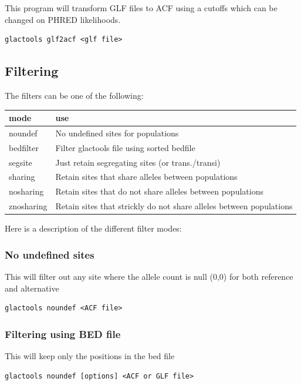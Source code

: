 \documentclass[a4paper]{article}
\begin{document}
This program will transform GLF files to ACF using a cutoffs which can be changed on PHRED likelihoods.
\begin{lstlisting}
glactools glf2acf <glf file>
\end{lstlisting}



\subsection{Filtering}
The filters can be one of the following:

\begin{tabular}{ll}
\hline
mode & use \\
\hline
noundef      &   No undefined sites for populations \\
bedfilter    &   Filter glactools file using sorted bedfile \\
segsite      &   Just retain segregating sites (or trans./transi) \\
sharing      &   Retain sites that share alleles between populations \\
nosharing    &   Retain sites that do not share alleles between populations \\
znosharing   &   Retain sites that strickly do not share alleles between populations \\
\end{tabular}

Here is a description of the different filter modes:

\subsubsection{No undefined sites}

\noindent This will filter out any site where the allele count is null (0,0) for both reference and alternative

\begin{lstlisting}
glactools noundef <ACF file>
\end{lstlisting}


\subsubsection{Filtering using BED file}

\noindent This will keep only the positions in the bed file

\begin{lstlisting}
glactools noundef [options] <ACF or GLF file>
\end{lstlisting}
\end{document}

